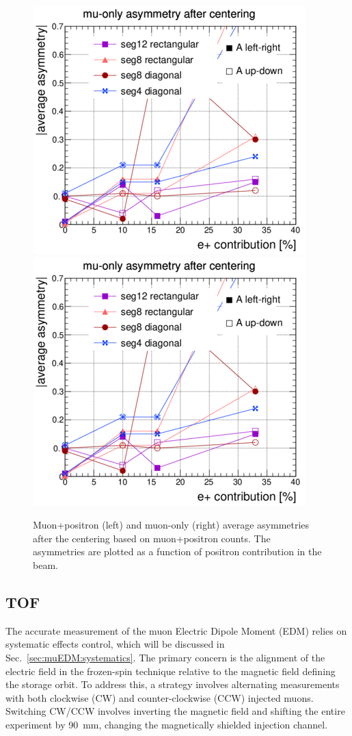 \begin{refsection}
        \begin{figure}
            \centering
            \includegraphics[width=0.4\linewidth]{Figures/muEDM/BeamMonitor/Mu+OnlyAsymm.png}
               \hspace{0.8cm}
            \includegraphics[width=0.4\linewidth]{Figures/muEDM/BeamMonitor/Mu-OnlyAsymm.png}
            \caption[muEDM: Beam monitor study of the positron contamination]{Muon+positron (left) and muon-only (right) average asymmetries after the centering based on muon+positron counts. The asymmetries are plotted as a function of positron contribution in the beam.}
            \label{fig:BeamMonAsymmSim}
        \end{figure}
        
    \subsection{TOF}
        The accurate measurement of the muon Electric Dipole Moment (EDM) relies on systematic effects control, which will be discussed in Sec.~\ref{sec:muEDM:systematics}. 
        The primary concern is the alignment of the electric field in the frozen-spin technique relative to the magnetic field defining the storage orbit. 
        To address this, a strategy involves alternating measurements with both clockwise (CW) and counter-clockwise (CCW) injected muons. 
        Switching CW/CCW involves inverting the magnetic field and shifting the entire experiment by \SI{90}{mm}, changing the magnetically shielded injection channel.
        

\end{refsection}
